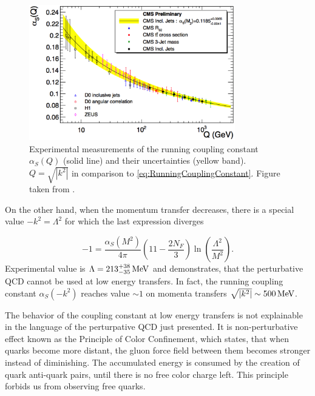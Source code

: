 \begin{figure}[t]
  \centering
  \includegraphics[width=0.8\textwidth]{Chapter1/RunningCouplingConstant.png}
  \caption[Experimental measurements of the running coupling constant $\alpha_S(Q)$
          (solid line) and its uncertainty (yellow band).
          $Q=\sqrt{\left|k^2\right|}$ in comparison to
          \eqref{eq:RunningCouplingConstant}.]
          {Experimental measurements of the running
          coupling constant $\alpha_S(Q)$ (solid line) and their uncertainties (yellow
          band).  $Q=\sqrt{\left|k^2\right|}$ in comparison to
          \eqref{eq:RunningCouplingConstant}. Figure taken from
          \cite{RunningCouplingConstantMess}. }
  \label{fig:RunningCouplingConstant}
\end{figure}

On the other hand, when the momentum transfer decreases, there is a special value
$-k^2=\Lambda^2$ for which the last expression diverges

\begin{equation}
  -1 = \frac{\alpha_S(M^2)}{4\pi} \left( 11 - \frac{2N_F}{3} \right)
  \ln \left( \frac{\Lambda^2}{M^2} \right).
  \label{eq:RunningLambda}
\end{equation}
Experimental value is $\Lambda=213^{+38}_{-35}\,\text{MeV}$ \cite{wiki:QCDHistory} and
demonstrates, that the perturbative QCD cannot be used at low energy transfers.
In fact, the running coupling constant $\alpha_S(-k^2)$ reaches value $\sim 1$
on momenta transfers $\sqrt{\left| k^2 \right|} \sim 500\,\text{MeV}$. 

The behavior of the coupling constant at low energy transfers is not explainable in
the language of the perturpative QCD just presented. It is non-perturbative effect
known as the Principle of Color Confinement, which states, that when quarks
become more distant, the gluon force field between them becomes stronger instead of
diminishing. The accumulated energy is consumed by the creation of quark
anti-quark pairs, until there is no free color charge left. This principle
forbids us from observing free quarks.

